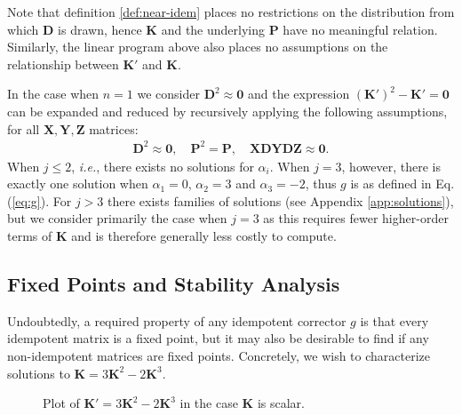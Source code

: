 \documentclass{article}
\theoremstyle{plain}
\theoremstyle{definition}
\theoremstyle{remark}
\newcommand{\vD}{\mathbf{D}}
\newcommand{\vK}{\mathbf{K}}
\newcommand{\vP}{\mathbf{P}}
\newcommand{\vX}{\mathbf{X}}
\newcommand{\vY}{\mathbf{Y}}
\newcommand{\vZ}{\mathbf{Z}}
\begin{document}
Note that definition \ref{def:near-idem} places no restrictions on the distribution from which $\vD$ is drawn, hence $\vK$ and the underlying $\vP$ have no meaningful relation. Similarly, the linear program above also places no assumptions on the relationship between $\vK'$ and $\vK$.

In the case when $n=1$ we consider ${\vD^2 \approx \bm{0}}$ and the expression ${(\vK')^2 - \vK' = \bm{0}}$ can be expanded and reduced by recursively applying the following assumptions, for all $\vX,\vY,\vZ$ matrices:
%
\begin{align}
    \vD^2 \approx \bm{0}, \quad \vP^2 = \vP, \quad \vX \vD \vY \vD \vZ \approx \bm{0}.
\end{align}
%
When $j\leq2$, \textit{i.e.}, there exists no solutions for $\alpha_i$. When $j=3$, however, there is exactly one solution when ${\alpha_1 = 0}$, ${\alpha_2 = 3}$ and ${\alpha_3 = -2}$, thus $g$ is as defined in Eq. (\ref{eq:g}). For $j>3$ there exists families of solutions (see Appendix \ref{app:solutions}), but we consider primarily the case when $j=3$ as this requires fewer higher-order terms of $\vK$ and is therefore generally less costly to compute.

\subsection{Fixed Points and Stability Analysis}
\label{sec:method-fixed-stab}
Undoubtedly, a required property of any idempotent corrector $g$ is that every idempotent matrix is a fixed point, but it may also be desirable to find if any non-idempotent matrices are fixed points. Concretely, we wish to characterize solutions to ${\vK = 3 \vK^2 - 2 \vK^3}$.

\begin{figure}[h]
    \centering
    \caption{Plot of $\vK' = 3 \vK^2 - 2 \vK^3$ in the case $\vK$ is scalar.}
    \label{fig:plot-g}
\end{figure}
\end{document}
